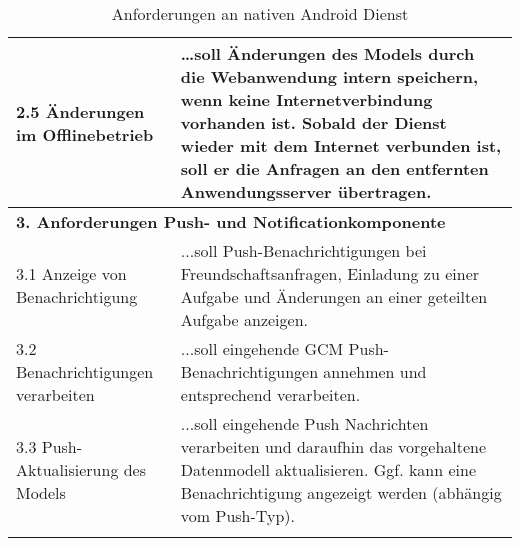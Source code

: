 \begin{longtable}{@{}XX@{}}
2.5 Änderungen im Offlinebetrieb & …soll Änderungen des Models durch die Webanwendung intern speichern, wenn keine Internetverbindung vorhanden ist. Sobald der Dienst wieder mit dem Internet verbunden ist, soll er die Anfragen an den entfernten Anwendungsserver übertragen. \\[10pt]
\midrule
\multicolumn{2}{p{\dimexpr\textwidth-2\tabcolsep\relax}}{\textbf{3. Anforderungen Push- und Notificationkomponente}} \\
\midrule
3.1 Anzeige von Benachrichtigung & ...soll Push-Benachrichtigungen bei Freundschaftsanfragen, Einladung zu einer Aufgabe und Änderungen an einer geteilten Aufgabe anzeigen. \\[6pt]
3.2 Benachrichtigungen verarbeiten & ...soll eingehende GCM Push-Benachrichtigungen annehmen und entsprechend verarbeiten. \\[6pt]
3.3 Push-Aktualisierung des Models & ...soll eingehende Push Nachrichten verarbeiten und daraufhin das vorgehaltene Datenmodell aktualisieren. Ggf. kann eine Benachrichtigung angezeigt werden (abhängig vom Push-Typ).\\[6pt]
\bottomrule
\caption{Anforderungen an nativen Android Dienst}
\label{tbl_anforderungen-android}
\end{longtable}
